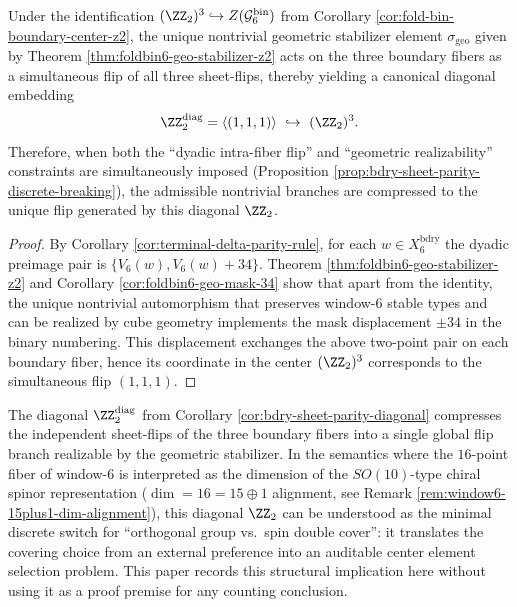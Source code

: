 \begin{corollary}\label{cor:bdry-sheet-parity-diagonal}
Under the identification \((\ZZ_2)^3\hookrightarrow Z(\mathcal{G}^{\mathrm{bin}}_6)\) from Corollary \ref{cor:fold-bin-boundary-center-z2},
the unique nontrivial geometric stabilizer element \(\sigma_{\mathrm{geo}}\) given by Theorem \ref{thm:foldbin6-geo-stabilizer-z2}
acts on the three boundary fibers as a simultaneous flip of all three sheet-flips,
thereby yielding a canonical diagonal embedding
\[
\ZZ_2^{\mathrm{diag}}=\langle(1,1,1)\rangle\ \hookrightarrow\ (\ZZ_2)^3.
\]
Therefore, when both the ``dyadic intra-fiber flip'' and ``geometric realizability'' constraints are simultaneously imposed (Proposition \ref{prop:bdry-sheet-parity-discrete-breaking}),
the admissible nontrivial branches are compressed to the unique flip generated by this diagonal \(\ZZ_2\).
\end{corollary}
\begin{proof}
By Corollary \ref{cor:terminal-delta-parity-rule}, for each \(w\in X_6^{\mathrm{bdry}}\) the dyadic preimage pair is \(\{V_6(w),V_6(w)+34\}\).
Theorem \ref{thm:foldbin6-geo-stabilizer-z2} and Corollary \ref{cor:foldbin6-geo-mask-34} show that
apart from the identity, the unique nontrivial automorphism that preserves window-\(6\) stable types and can be realized by cube geometry implements the mask displacement \(\pm 34\) in the binary numbering.
This displacement exchanges the above two-point pair on each boundary fiber, hence its coordinate in the center \((\ZZ_2)^3\) corresponds to the simultaneous flip \((1,1,1)\).
\end{proof}

\begin{remark}\label{rem:bdry-diagonal-z2-spin-cover}
The diagonal \(\ZZ_2^{\mathrm{diag}}\) from Corollary \ref{cor:bdry-sheet-parity-diagonal} compresses the independent sheet-flips of the three boundary fibers into a single global flip branch realizable by the geometric stabilizer.
In the semantics where the \(16\)-point fiber of window-\(6\) is interpreted as the dimension of the \(SO(10)\)-type chiral spinor representation (\(\dim=16=15\oplus 1\) alignment, see Remark \ref{rem:window6-15plus1-dim-alignment}),
this diagonal \(\ZZ_2\) can be understood as the minimal discrete switch for ``orthogonal group vs.\ spin double cover'': it translates the covering choice from an external preference into an auditable center element selection problem.
This paper records this structural implication here without using it as a proof premise for any counting conclusion.
\end{remark}

